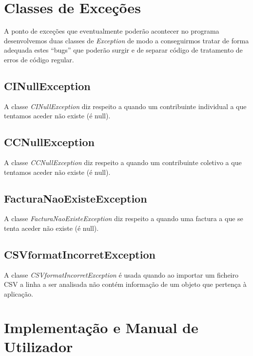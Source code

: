 \documentclass[a4paper]{article}
\begin{document}
\section{Classes de Exceções}
\label{sec:excecoes}

A ponto de exceções que eventualmente poderão acontecer no programa desenvolvemos
duas classes de \emph{Exception} de modo a conseguirmos tratar de forma adequada
estes ``bugs'' que poderão surgir e de separar código de tratamento de erros de
código regular.



\subsection{CINullException}
\label{sec:cinullexception}

A classe \emph{CINullException} diz respeito a quando um
contribuinte individual a que tentamos aceder não existe (é null).



\subsection{CCNullException}
\label{sec:ccnullexception}

A classe \emph{CCNullException} diz respeito a quando um
contribuinte coletivo a que tentamos aceder não existe (é null).



\subsection{FacturaNaoExisteException}
\label{sec:FacturaNaoExiste}

A classe \emph{FacturaNaoExisteException} diz respeito a quando uma
factura a que se tenta aceder não existe (é null).



\subsection{CSVformatIncorretException}
\label{sec:CSVformatIncorret}

A classe \emph{CSVformatIncorretException} é usada quando ao importar um
ficheiro CSV a linha a ser analisada não contém informação de um objeto que
pertença à aplicação.



\section{Implementação e Manual de Utilizador}
\label{sec:implementacao}
\end{document}
